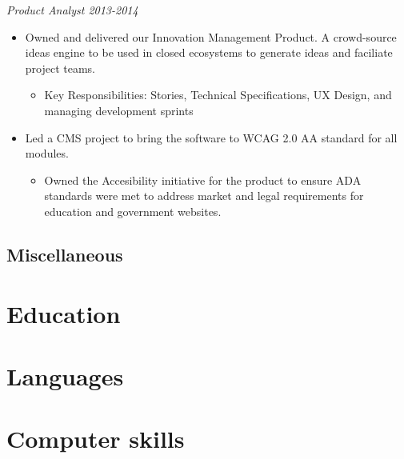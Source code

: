\documentclass[11pt,letterpaper,roman]{moderncv}
\begin{document}
    \textit{Product Analyst 2013-2014}%
    \begin{itemize}%
        \item Owned and delivered our Innovation Management Product. A crowd-source ideas engine to be used in closed ecosystems to generate ideas and faciliate project teams.
            \begin{itemize}
                \item Key Responsibilities: Stories, Technical Specifications, UX Design, and managing development sprints
            \end{itemize}
        \item Led a CMS project to bring the software to WCAG 2.0 AA standard for all modules. 
            \begin{itemize}
                \item Owned the Accesibility initiative for the product to ensure ADA standards were met to address market and legal requirements for education and government websites.
            \end{itemize}
    \end{itemize}


    \subsection{Miscellaneous}

    \section{Education}
    
    \section{Languages}
    
    \section{Computer skills}
    
\end{document}
